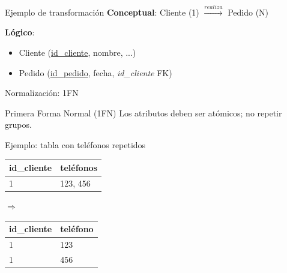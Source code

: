 \documentclass[aspectratio=169, 10pt, xcolor=table]{beamer}
\begin{document}
\begin{frame}{Ejemplo de transformación}
    \textbf{Conceptual}: Cliente (1) $\xrightarrow{realiza}$ Pedido (N)
    \vspace{0.2cm}
    \begin{center}
    \end{center}
    \textbf{Lógico}:
    \begin{itemize}
        \item Cliente (\underline{id\_cliente}, nombre, ...)
        \item Pedido (\underline{id\_pedido}, fecha, \textit{id\_cliente} FK)
    \end{itemize}
\end{frame}

\begin{frame}{Normalización: 1FN}
    \begin{block}{Primera Forma Normal (1FN)}
        Los atributos deben ser atómicos; no repetir grupos.
    \end{block}
    \begin{exampleblock}{Ejemplo: tabla con teléfonos repetidos}
        \begin{tabular}{l|l}
            id\_cliente & teléfonos \\
            \hline
            1 & 123, 456
        \end{tabular}
        \hspace{0.5cm} $\Rightarrow$ \hspace{0.5cm}
        \begin{tabular}{l|l}
            id\_cliente & teléfono \\
            \hline
            1 & 123 \\
            1 & 456
        \end{tabular}
    \end{exampleblock}
\end{frame}
\end{document}
